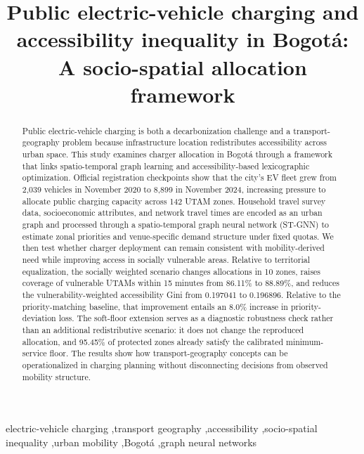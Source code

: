 \documentclass[final,5p,times,twocolumn,authoryear]{elsarticle}
\begin{document}
\begin{frontmatter}

\title{Public electric-vehicle charging and accessibility inequality in Bogot\'a: A socio-spatial allocation framework}


\begin{abstract}

Public electric-vehicle charging is both a decarbonization challenge and a transport-
geography problem because infrastructure location redistributes accessibility across urban
space. This study examines charger allocation in Bogot\'a through a framework that links
spatio-temporal graph learning and accessibility-based lexicographic optimization. Official
registration checkpoints show that the city's EV fleet grew from 2,039 vehicles in November
2020 to 8,899 in November 2024, increasing pressure to allocate public charging capacity
across 142 UTAM zones. Household travel survey data, socioeconomic attributes, and network
travel times are encoded as an urban graph and processed through a spatio-temporal graph
neural network (ST-GNN) to estimate zonal priorities and venue-specific demand structure
under fixed quotas. We then test whether charger deployment can remain consistent with
mobility-derived need while improving access in socially vulnerable areas. Relative to
territorial equalization, the socially weighted scenario changes allocations in 10 zones,
raises coverage of vulnerable UTAMs within 15 minutes from 86.11\% to 88.89\%, and reduces
the vulnerability-weighted accessibility Gini from 0.197041 to 0.196896. Relative to the
priority-matching baseline, that improvement entails an 8.0\% increase in priority-
deviation loss. The soft-floor extension serves as a diagnostic robustness check rather
than an additional redistributive scenario: it does not change the reproduced allocation,
and 95.45\% of protected zones already satisfy the calibrated minimum-service floor. The
results show how transport-geography concepts can be operationalized in charging planning
without disconnecting decisions from observed mobility structure.
\end{abstract}

\begin{keyword}
electric-vehicle charging \sep transport geography \sep accessibility \sep socio-spatial inequality \sep urban mobility \sep Bogot\'a \sep graph neural networks
\end{keyword}

\end{frontmatter}
\end{document}
